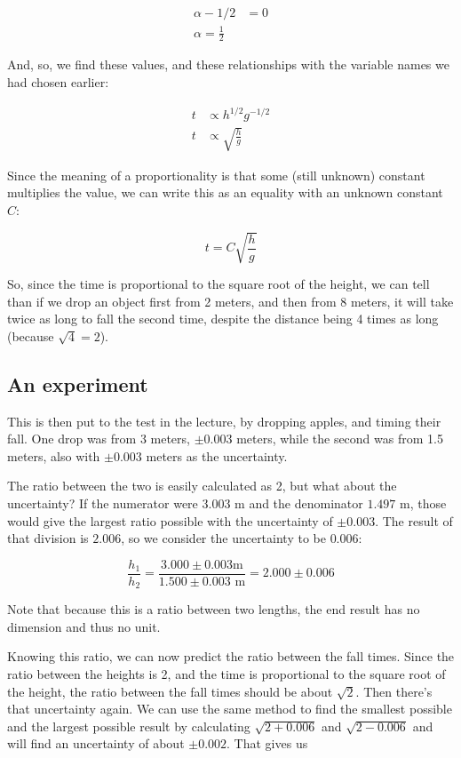 \documentclass[12pt,a4paper]{report}
\begin{document}
\begin{align*}
\alpha - 1/2 &= 0\\
\alpha = \frac{1}{2}
\end{align*}

And, so, we find these values, and these relationships with the variable names we had chosen earlier:

\begin{align}
t &\propto h^{1/2} g^{-1/2} \\
t &\propto \sqrt{\frac{h}{g}}
\end{align}

Since the meaning of a proportionality is that some (still unknown) constant multiplies the value, we can write this as an equality with an unknown constant $C$:

\begin{equation}
 t = C \sqrt{\frac{h}{g}}
\end{equation}

So, since the time is proportional to the square root of the height, we can tell than if we drop an object first from 2 meters, and then from 8 meters, it will take twice as long to fall the second time, despite the distance being 4 times as long (because $\sqrt{4} = 2$).

\subsection{An experiment}

This is then put to the test in the lecture, by dropping apples, and timing their fall. One drop was from 3 meters, $\pm 0.003$ meters, while the second was from 1.5 meters, also with $\pm 0.003$ meters as the uncertainty.

The ratio between the two is easily calculated as 2, but what about the uncertainty? If the numerator were $3.003$ m and the denominator $1.497$ m, those would give the largest ratio possible with the uncertainty of $\pm 0.003$. The result of that division is $2.006$, so we consider the uncertainty to be $0.006$:

\begin{equation}
 \frac{h_1}{h_2} = \frac{3.000 \pm 0.003 \text {m}}{1.500 \pm 0.003 \text{ m}} = 2.000 \pm 0.006
\end{equation}

Note that because this is a ratio between two lengths, the end result has no dimension and thus no unit.

Knowing this ratio, we can now predict the ratio between the fall times. Since the ratio between the heights is 2, and the time is proportional to the square root of the height, the ratio between the fall times should be about $\sqrt{2}$. Then there's that uncertainty again. We can use the same method to find the smallest possible and the largest possible result by calculating $\sqrt{2+0.006}$ and $\sqrt{2-0.006}$ and will find an uncertainty of about $\pm 0.002$. That gives us
\end{document}
